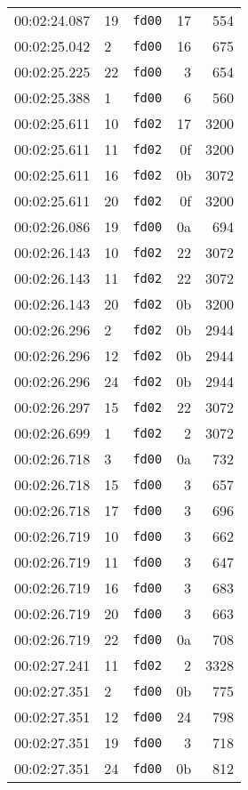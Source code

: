 \documentclass{article}
\begin{document}
\begin{longtable}{lllrr}
00:02:24.087 & 19 & \texttt{fd00} & 17 & 554 \\
00:02:25.042 & 2 & \texttt{fd00} & 16 & 675 \\
00:02:25.225 & 22 & \texttt{fd00} & 3 & 654 \\
00:02:25.388 & 1 & \texttt{fd00} & 6 & 560 \\
00:02:25.611 & 10 & \texttt{fd02} & 17 & 3200 \\
00:02:25.611 & 11 & \texttt{fd02} & 0f & 3200 \\
00:02:25.611 & 16 & \texttt{fd02} & 0b & 3072 \\
00:02:25.611 & 20 & \texttt{fd02} & 0f & 3200 \\
00:02:26.086 & 19 & \texttt{fd00} & 0a & 694 \\
00:02:26.143 & 10 & \texttt{fd02} & 22 & 3072 \\
00:02:26.143 & 11 & \texttt{fd02} & 22 & 3072 \\
00:02:26.143 & 20 & \texttt{fd02} & 0b & 3200 \\
00:02:26.296 & 2 & \texttt{fd02} & 0b & 2944 \\
00:02:26.296 & 12 & \texttt{fd02} & 0b & 2944 \\
00:02:26.296 & 24 & \texttt{fd02} & 0b & 2944 \\
00:02:26.297 & 15 & \texttt{fd02} & 22 & 3072 \\
00:02:26.699 & 1 & \texttt{fd02} & 2 & 3072 \\
00:02:26.718 & 3 & \texttt{fd00} & 0a & 732 \\
00:02:26.718 & 15 & \texttt{fd00} & 3 & 657 \\
00:02:26.718 & 17 & \texttt{fd00} & 3 & 696 \\
00:02:26.719 & 10 & \texttt{fd00} & 3 & 662 \\
00:02:26.719 & 11 & \texttt{fd00} & 3 & 647 \\
00:02:26.719 & 16 & \texttt{fd00} & 3 & 683 \\
00:02:26.719 & 20 & \texttt{fd00} & 3 & 663 \\
00:02:26.719 & 22 & \texttt{fd00} & 0a & 708 \\
00:02:27.241 & 11 & \texttt{fd02} & 2 & 3328 \\
00:02:27.351 & 2 & \texttt{fd00} & 0b & 775 \\
00:02:27.351 & 12 & \texttt{fd00} & 24 & 798 \\
00:02:27.351 & 19 & \texttt{fd00} & 3 & 718 \\
00:02:27.351 & 24 & \texttt{fd00} & 0b & 812 \\

\end{longtable}
\end{document}
